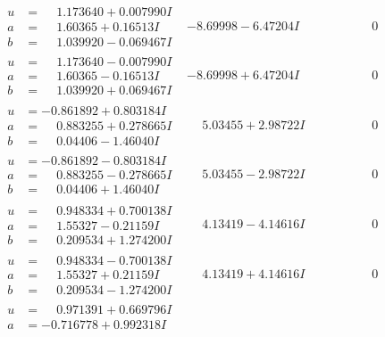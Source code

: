 \documentclass[1p]{elsarticle_modified}
\theoremstyle{definition}
\begin{document}
$$\begin{array}{c|c|c}
\begin{aligned}
u &= \phantom{-}1.173640 + 0.007990 I \\
a &= \phantom{-}1.60365 + 0.16513 I \\
b &= \phantom{-}1.039920 - 0.069467 I\end{aligned}
 & -8.69998 - 6.47204 I & \phantom{-0.000000 } 0 \\ \hline\begin{aligned}
u &= \phantom{-}1.173640 - 0.007990 I \\
a &= \phantom{-}1.60365 - 0.16513 I \\
b &= \phantom{-}1.039920 + 0.069467 I\end{aligned}
 & -8.69998 + 6.47204 I & \phantom{-0.000000 } 0 \\ \hline\begin{aligned}
u &= -0.861892 + 0.803184 I \\
a &= \phantom{-}0.883255 + 0.278665 I \\
b &= \phantom{-}0.04406 - 1.46040 I\end{aligned}
 & \phantom{-}5.03455 + 2.98722 I & \phantom{-0.000000 } 0 \\ \hline\begin{aligned}
u &= -0.861892 - 0.803184 I \\
a &= \phantom{-}0.883255 - 0.278665 I \\
b &= \phantom{-}0.04406 + 1.46040 I\end{aligned}
 & \phantom{-}5.03455 - 2.98722 I & \phantom{-0.000000 } 0 \\ \hline\begin{aligned}
u &= \phantom{-}0.948334 + 0.700138 I \\
a &= \phantom{-}1.55327 - 0.21159 I \\
b &= \phantom{-}0.209534 + 1.274200 I\end{aligned}
 & \phantom{-}4.13419 - 4.14616 I & \phantom{-0.000000 } 0 \\ \hline\begin{aligned}
u &= \phantom{-}0.948334 - 0.700138 I \\
a &= \phantom{-}1.55327 + 0.21159 I \\
b &= \phantom{-}0.209534 - 1.274200 I\end{aligned}
 & \phantom{-}4.13419 + 4.14616 I & \phantom{-0.000000 } 0 \\ \hline\begin{aligned}
u &= \phantom{-}0.971391 + 0.669796 I \\
a &= -0.716778 + 0.992318 I \\

\end{aligned}
\end{array}$$
\end{document}
